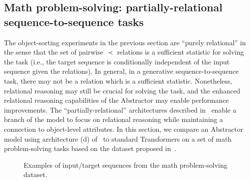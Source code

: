 \subsection{Math problem-solving: partially-relational sequence-to-sequence tasks}\label{ssec:experiments_math}

The object-sorting experiments in the previous section are ``purely relational'' in the sense that the set of pairwise $\prec$ relations is a sufficient statistic for solving the task (i.e., the target sequence is conditionally independent of the input sequence given the relations). In general, in a generative sequence-to-sequence task, there may not be a relation which is a sufficient statistic. Nonetheless, relational reasoning may still be crucial for solving the task, and the enhanced relational reasoning capabilities of the Abstractor may enable performance improvements. The ``partially-relational'' architectures described in~ enable a branch of the model to focus on relational reasoning while maintaining a connection to object-level attributes. In this section, we compare an Abstractor model using architecture (d) of~ to standard Transformers on a set of math problem-solving tasks based on the dataset proposed in~\citep{saxtonAnalyzingMathematicalReasoning2019}.

\begin{figure}
    \begin{center}
    \end{center}
\caption{Examples of input/target sequences from the math problem-solving dataset.}\label{fig:math_dataset}
\end{figure}

